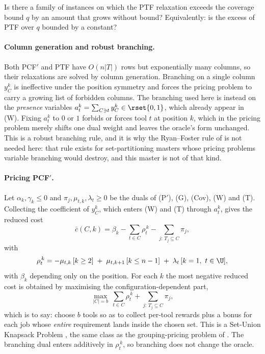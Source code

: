 \begin{problem}\label{prob:ptf-gap}
Is there a family of instances on which the PTF relaxation exceeds the coverage bound
$q$ by an amount that grows without bound? Equivalently: is the excess of PTF over $q$
bounded by a constant?
\end{problem}

\paragraph{Column generation and robust branching.}
Both PCF$'$ and PTF have $O(n\lvert T\rvert)$ rows but exponentially many columns, so
their relaxations are solved by column generation. Branching on a single column
$y_C^{k}$ is ineffective under the position symmetry and forces the pricing problem to
carry a growing list of forbidden columns. The branching used here is instead on the
\emph{presence} variables $a_t^{k}=\sum_{C\ni t}y_C^{k}\in\rset{0,1}$, which already
appear in (W). Fixing $a_t^{k}$ to $0$ or $1$ forbids or forces tool $t$ at position
$k$, which in the pricing problem merely shifts one dual weight and leaves the
oracle's form unchanged. This is a robust branching rule, and it is why the
Ryan--Foster rule of \citet{Ryan1981} is not needed here: that rule exists for
set-partitioning masters whose pricing problems variable branching would destroy, and
this master is not of that kind.

\paragraph{Pricing PCF$'$.}
Let $\alpha_k,\gamma_k\le0$ and $\pi_j,\mu_{t,k},\lambda_t\ge0$ be the duals of
(P$'$), (G), (Cov), (W) and (T). Collecting the coefficient of $y_C^{k}$, which enters
(W) and (T) through $a_t^{k}$, gives the reduced cost
\[
  \bar c(C,k)=\beta_k-\sum_{t\in C}\rho_t^{\,k}-\!\!\sum_{j:\,T_j\subseteq C}\!\!\pi_j,
\]
with
\[
  \rho_t^{\,k}=-\mu_{t,k}\,[k\ge2]\;+\;\mu_{t,k+1}\,[k\le n-1]\;+\;\lambda_t\,[k=1,\ t\in\U],
\]
with $\beta_k$ depending only on the position. For each $k$ the most negative reduced
cost is obtained by maximising the configuration-dependent part,
\[
  \max_{\lvert C\rvert=b}\ \sum_{t\in C}\rho_t^{\,k}
  +\!\!\sum_{j:\,T_j\subseteq C}\!\!\pi_j ,
\]
which is to say: choose $b$ tools so as to collect per-tool rewards plus a bonus for
each job whose \emph{entire} requirement lands inside the chosen set. This is a
Set-Union Knapsack Problem \citep{Goldschmidt1994}, the same class as the
grouping-pricing problem of \citet{Crama1994Column}. The branching dual enters
additively in $\rho_t^{\,k}$, so branching does not change the oracle.

